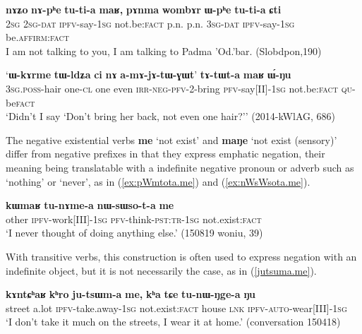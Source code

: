 \documentclass[oneside,a4paper,11pt]{article}
\newcommand{\ipa}[1]{\textbf{\phon#1}} %
\newcommand{\jpg}[2]{\ipa{#1} `#2'} %
\newcommand{\refb}[1]{(\ref{#1})}
\begin{document}
\begin{exe}
\ex \label{tutia.maR}
 \gll \ipa{nɤʑo} 	\ipa{nɤ-pʰe} 	\ipa{tu-ti-a} 	\ipa{maʁ,} 	\ipa{pɤnma} 	\ipa{wombɤr} 	\ipa{ɯ-pʰe} 	\ipa{tu-ti-a} 	\ipa{ɕti} \\
 \textsc{2sg} \textsc{2sg-dat} \textsc{ipfv}-say-\textsc{1sg} not.be:\textsc{fact}  p.n. p.n. \textsc{3sg-dat} \textsc{ipfv}-say-\textsc{1sg} be.\textsc{affirm}:\textsc{fact} \\
 \glt  I am not talking to you, I am talking to Padma 'Od.'bar. (Slobdpon,190)
\end{exe}

\begin{exe}
\ex \label{tAtWta.maR}
 \gll 
`\ipa{ɯ-kɤrme} 	\ipa{tɯ-ldʑa} 	\ipa{ci} 	\ipa{nɤ} 	\ipa{a-mɤ-jɤ-tɯ-ɣɯt}' 	\ipa{tɤ-tɯt-a} 	\ipa{maʁ} 	\ipa{ɯ́-ŋu}  \\
\textsc{3sg.poss}-hair one-\textsc{cl} one even \textsc{irr-neg-pfv}-2-bring \textsc{pfv}-say[II]-\textsc{1sg} not.be:\textsc{fact} \textsc{qu}-be\textsc{fact} \\
\glt `Didn't I say `Don't bring her back, not even one hair?'' (2014-kWlAG, 686)
\end{exe}

The negative existential verbs \jpg{me}{not exist} and \jpg{maŋe}{not exist (sensory)} differ from negative prefixes in that they express emphatic negation, their meaning being translatable with a indefinite negative pronoun or adverb such as `nothing' or `never', as in \refb{ex:pWmtota.me} and \refb{ex:nWsWsota.me}.

\begin{exe}
\ex \label{ex:nWsWsota.me}
\gll  \ipa{kɯmaʁ} 	\ipa{tu-nɤme-a} 	\ipa{nɯ-sɯso-t-a} 	\ipa{me} \\
other \textsc{ipfv}-work[III]-\textsc{1sg} \textsc{pfv}-think-\textsc{pst:tr-1sg} not.exist:\textsc{fact} \\
\glt `I never thought of doing anything else.' (150819 woniu, 39)
\end{exe}  

With transitive verbs, this construction is often used to express negation with an indefinite object, but it is not necessarily the case, as in \refb{jutsuma.me}.

 \begin{exe}
\ex \label{jutsuma.me}
\gll 
    \ipa{kɤntɕʰaʁ} 	\ipa{kʰro} 	\ipa{ju-tsɯm-a} 	\ipa{me,} 	\ipa{kʰa} 	\ipa{tɕe} 	\ipa{tu-nɯ-ŋge-a} 	\ipa{ŋu} \\
    street a.lot \textsc{ipfv}-take.away-\textsc{1sg} not.exist:\textsc{fact} house \textsc{lnk} \textsc{ipfv-auto}-wear[III]-\textsc{1sg} \\
\glt `I don't take it much on the streets, I wear it at home.' (conversation 150418)
\end{exe} 
\end{document}
